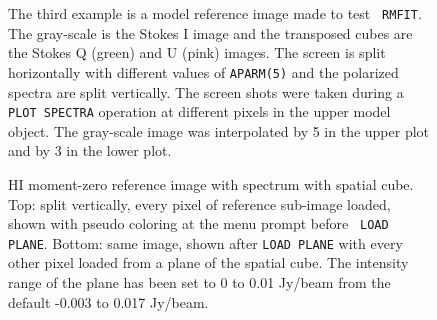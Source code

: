 \documentclass[twoside]{article}
\newcommand{\putfig}[1]{\texttt{[image: \#1]}}
\begin{document}
\begin{figure}
\begin{center}
\resizebox{6.5in}{!}{\putfig{TVSPCQUa.eps}}
\centerline{\hphantom{MM}}
\resizebox{6.5in}{!}{\putfig{TVSPCQUb.eps}}
\caption{The third example is a model reference image made to test {\tt
    RMFIT}\@.  The gray-scale is the Stokes I image and the transposed
  cubes are the Stokes Q (green) and U (pink) images.  The screen is
  split horizontally with different values of {\tt APARM(5)} and the
  polarized spectra are split vertically.  The screen shots were taken
  during a {\tt PLOT SPECTRA} operation at different pixels in the
  upper model object.  The gray-scale image was interpolated by 5 in
  the upper plot and by 3 in the lower plot.}
\label{fig:QUab}
\end{center}
\end{figure}

\begin{figure}
\begin{center}
\resizebox{6.03in}{!}{\putfig{TVSPCHIe.eps}}
\centerline{\hphantom{MM}}
\resizebox{6.03in}{!}{\putfig{TVSPCHIf.eps}}
\caption{HI moment-zero reference image with spectrum with spatial
  cube.  Top: split vertically, every pixel of reference sub-image
  loaded, shown with pseudo coloring at the menu prompt before {\tt
    LOAD PLANE}\@.  Bottom: same image, shown after {\tt LOAD PLANE}
  with every other pixel loaded from a plane of the spatial cube.
  The intensity range of the plane has been set to 0 to 0.01 Jy/beam
  from the default -0.003 to 0.017 Jy/beam.}
\label{fig:HIef}
\end{center}
\end{figure}
\end{document}
